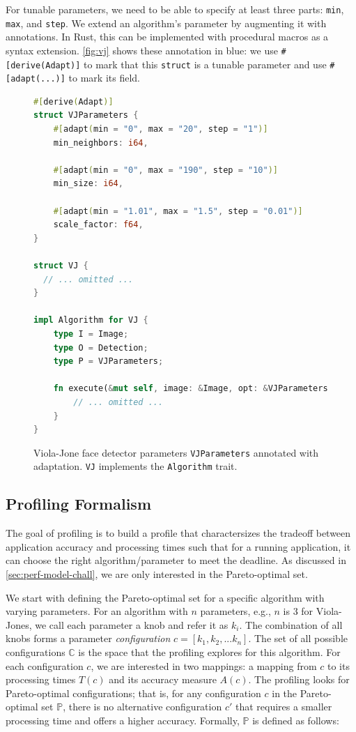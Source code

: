 For tunable parameters, we need to be able to specify at least three parts:
\texttt{min}, \texttt{max}, and \texttt{step}. We extend an algorithm's
parameter by augmenting it with annotations. In Rust, this can be implemented
with procedural macros as a syntax extension. \autoref{fig:vj} shows these
annotation in blue: we use \texttt{\#[derive(Adapt)]} to mark that this
\texttt{struct} is a tunable parameter and use \texttt{\#[adapt(...)]} to mark
its field.

\begin{figure}
  \centering
\begin{lstlisting}[language=Rust]
#[derive(Adapt)]
struct VJParameters {
    #[adapt(min = "0", max = "20", step = "1")]
    min_neighbors: i64,

    #[adapt(min = "0", max = "190", step = "10")]
    min_size: i64,

    #[adapt(min = "1.01", max = "1.5", step = "0.01")]
    scale_factor: f64,
}

struct VJ {
  // ... omitted ...
}

impl Algorithm for VJ {
    type I = Image;
    type O = Detection;
    type P = VJParameters;

    fn execute(&mut self, image: &Image, opt: &VJParameters) -> Detection {
        // ... omitted ...
    }
}
\end{lstlisting}
  \caption{Viola-Jone face detector parameters \texttt{VJParameters} annotated
    with adaptation. \texttt{VJ} implements the \texttt{Algorithm} trait.}
  \label{fig:vj}
\end{figure}

\subsection{Profiling Formalism}
\label{sec:profiling-formalism}

The goal of profiling is to build a profile that charactersizes the tradeoff
between application accuracy and processing times such that for a running
application, it can choose the right algorithm/parameter to meet the
deadline. As discussed in \autoref{sec:perf-model-chall}, we are only interested
in the Pareto-optimal set.

We start with defining the Pareto-optimal set for a specific algorithm with
varying parameters. For an algorithm with $n$ parameters, e.g., $n$ is 3 for
Viola-Jones, we call each parameter a knob and refer it as $k_i$. The
combination of all knobs forms a parameter \textit{configuration}
$c = [k_{1}, k_{2}, ... k_{n}]$. The set of all possible configurations
$\mathbb{C}$ is the space that the profiling explores for this algorithm. For
each configuration $c$, we are interested in two mappings: a mapping from $c$ to
its processing times $T(c)$ and its accuracy measure $A(c)$.  The profiling
looks for Pareto-optimal configurations; that is, for any configuration $c$ in
the Pareto-optimal set $\mathbb{P}$, there is no alternative configuration $c'$
that requires a smaller processing time and offers a higher accuracy. Formally,
$\mathbb{P}$ is defined as follows:

